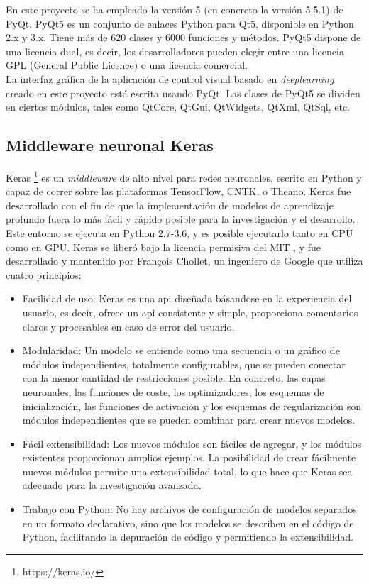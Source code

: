 En este proyecto se ha empleado la versión 5 (en concreto la versión 5.5.1) de PyQt. PyQt5 es un conjunto de enlaces Python para Qt5, disponible en Python 2.x y 3.x. Tiene más de 620 clases y 6000 funciones y métodos. PyQt5 dispone de una licencia dual, es decir, los desarrolladores pueden elegir entre una licencia GPL (General Public Licence) o una licencia comercial. \\

La interfaz gráfica de la aplicación de control visual basado en \textit{deeplearning} creado en este proyecto está escrita usando PyQt. Las clases de PyQt5 se dividen en ciertos módulos, tales como QtCore, QtGui, QtWidgets, QtXml, QtSql, etc. 


\subsection{Middleware neuronal Keras}

Keras \footnote{https://keras.io/} es un \textit{middleware} de alto nivel para redes neuronales, escrito en Python y capaz de correr sobre las plataformas TensorFlow, CNTK, o Theano. Keras fue desarrollado con el fin de que la implementación de modelos de aprendizaje profundo fuera lo  más fácil y rápido posible para la investigación y el desarrollo.\\

Este entorno se ejecuta en Python 2.7-3.6, y es posible ejecutarlo tanto en CPU como en GPU. Keras se liberó bajo la licencia permisiva del MIT \cite{Keras_license}, y fue desarrollado y mantenido por François Chollet, un ingeniero de Google que utiliza cuatro principios:

\begin{itemize}
        \item Facilidad de uso: Keras es una \acrshort{api} diseñada básandose en la experiencia del usuario, es decir, ofrece un \acrshort{api} consistente y simple, proporciona comentarios claros y procesables en caso de error del usuario.
    
    \item Modularidad: Un modelo se entiende como una secuencia o un gráfico de módulos independientes, totalmente configurables, que se pueden conectar con la menor cantidad de restricciones posible. En concreto, las capas neuronales, las funciones de coste, los optimizadores, los esquemas de inicialización, las funciones de activación y los esquemas de regularización son módulos independientes que se pueden combinar para crear nuevos modelos.
    
    \item Fácil extensibilidad: Los nuevos módulos son fáciles de agregar, y los módulos existentes proporcionan amplios ejemplos. La posibilidad de crear fácilmente nuevos módulos permite una extensibilidad total, lo que hace que Keras sea adecuado para la investigación avanzada.
    
    \item Trabajo con Python: No hay archivos de configuración de modelos separados en un formato declarativo, sino que los modelos se describen en el código de Python, facilitando la depuración de código y permitiendo la extensibilidad.
\end{itemize}

